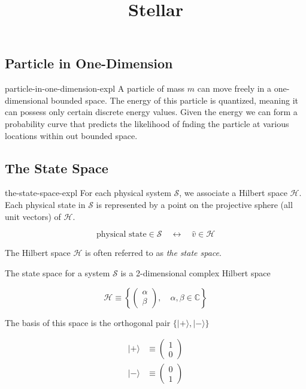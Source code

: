 \documentclass[preview]{standalone}
\begin{document}
\title{Stellar}
\genpage


\subsection{Particle in One-Dimension}

\begin{snippet}{particle-in-one-dimension-expl}
    A particle of mass \(m\) can move freely in a one-dimensional bounded space.
    The energy of this particle is quantized, meaning it can possess only certain discrete energy values.
    Given the energy we can form a probability curve that predicts the likelihood of fnding the particle at various locations within out bounded space.
\end{snippet}

\subsection{The State Space}

\begin{snippet}{the-state-space-expl}
    For each physical system \(\mathscr{S}\), we associate a Hilbert space \(\mathcal{H}\).
    Each physical state in \(\mathscr{S}\) is represented by a point on the projective sphere (all unit vectors) of \(\mathcal{H}\).

    \[
        \text{physical state} \in \mathscr{S} \quad\longleftrightarrow\quad \hat{v} \in \mathcal{H}
    \]

    The Hilbert space \(\mathcal{H}\) is often referred to as \textit{the state space}.

    The state space for a system \(\mathscr{S}\) is a 2-dimensional complex Hilbert space

    \[
        \mathcal{H} \equiv
        \left\{
            \begin{pmatrix}
                \alpha \\
                \beta
            \end{pmatrix}
            ,\quad \alpha ,\beta \in \mathbb{C}
        \right\}
    \]

    The basis of this space is the orthogonal pair \(\{|+\rangle ,|-\rangle\}\)

    \begin{align*}
        |+\rangle &\equiv
        \begin{pmatrix}
            1 \\
            0
        \end{pmatrix} \\
        |-\rangle &\equiv
        \begin{pmatrix}
            0 \\
            1
        \end{pmatrix}
    \end{align*}

\end{snippet}
\end{document}
